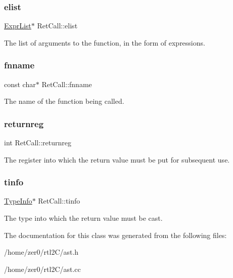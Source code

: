 \subsubsection{\texorpdfstring{elist}{elist}}
{\footnotesize\ttfamily \hyperlink{class_expr_list}{Expr\+List}$\ast$ Ret\+Call\+::elist\hspace{0.3cm}{\ttfamily [protected]}}

The list of arguments to the function, in the form of expressions. \mbox{\label{class_ret_call_ade43d299c39866859178279cfe6a85bd}} 
\subsubsection{\texorpdfstring{fnname}{fnname}}
{\footnotesize\ttfamily const char$\ast$ Ret\+Call\+::fnname\hspace{0.3cm}{\ttfamily [protected]}}

The name of the function being called. \mbox{\label{class_ret_call_a3fc6d5d729c3d0e52b4e8020719c9d08}} 
\subsubsection{\texorpdfstring{returnreg}{returnreg}}
{\footnotesize\ttfamily int Ret\+Call\+::returnreg\hspace{0.3cm}{\ttfamily [protected]}}

The register into which the return value must be put for subsequent use. \mbox{\label{class_ret_call_a5dd7e7af3540ea68eae6e3c4c572e426}} 
\subsubsection{\texorpdfstring{tinfo}{tinfo}}
{\footnotesize\ttfamily \hyperlink{class_type_info}{Type\+Info}$\ast$ Ret\+Call\+::tinfo\hspace{0.3cm}{\ttfamily [protected]}}

The type into which the return value must be cast. 

The documentation for this class was generated from the following files\+:\begin{DoxyCompactItemize}
\item 
/home/zer0/rtl2\+C/ast.\+h\item 
/home/zer0/rtl2\+C/ast.\+cc\end{DoxyCompactItemize}
